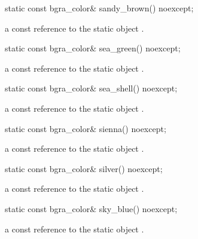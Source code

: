 \begin{itemdecl}
static const bgra_color& sandy_brown() noexcept;
\end{itemdecl}
\begin{itemdescr}
\pnum
\returns
a const reference to the static  object .
\end{itemdescr}

\begin{itemdecl}
static const bgra_color& sea_green() noexcept;
\end{itemdecl}
\begin{itemdescr}
\pnum
\returns
a const reference to the static  object .
\end{itemdescr}

\begin{itemdecl}
static const bgra_color& sea_shell() noexcept;
\end{itemdecl}
\begin{itemdescr}
\pnum
\returns
a const reference to the static  object .
\end{itemdescr}

\begin{itemdecl}
static const bgra_color& sienna() noexcept;
\end{itemdecl}
\begin{itemdescr}
\pnum
\returns
a const reference to the static  object .
\end{itemdescr}

\begin{itemdecl}
static const bgra_color& silver() noexcept;
\end{itemdecl}
\begin{itemdescr}
\pnum
\returns
a const reference to the static  object .
\end{itemdescr}

\begin{itemdecl}
static const bgra_color& sky_blue() noexcept;
\end{itemdecl}
\begin{itemdescr}
\pnum
\returns
a const reference to the static  object .
\end{itemdescr}

